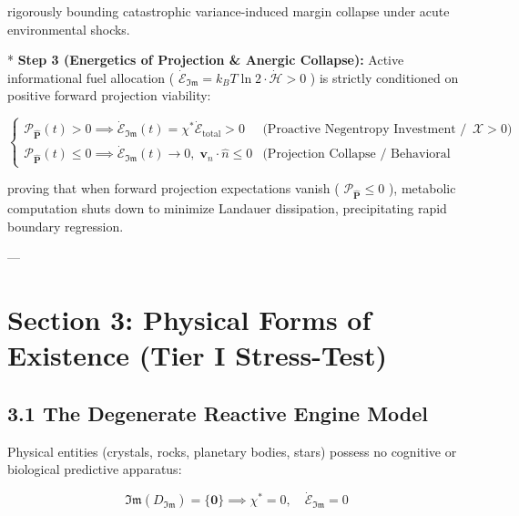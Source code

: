 \documentclass[11pt,a4paper]{article}
\theoremstyle{definition}
\theoremstyle{remark}
\begin{document}
rigorously bounding catastrophic variance-induced margin collapse under acute environmental shocks.

* \textbf{Step 3 (Energetics of Projection \& Anergic Collapse):}
Active informational fuel allocation ( $\dot{\mathcal{E}}_{\mathfrak{Im}} = k_B T \ln 2 \cdot \dot{\mathcal{H}} > 0$ ) is strictly conditioned on positive forward projection viability:


\begin{equation}
\boxed{\begin{cases}
\mathcal{P}_{\hat{\mathbf{P}}}(t) > 0 \implies \dot{\mathcal{E}}_{\mathfrak{Im}}(t) = \chi^* \dot{\mathcal{E}}_{\text{total}} > 0 & \text{(Proactive Negentropy Investment / Exploratory Expression } \boldsymbol{\mathcal{X}} > 0\text{)} \\
\mathcal{P}_{\hat{\mathbf{P}}}(t) \le 0 \implies \dot{\mathcal{E}}_{\mathfrak{Im}}(t) \longrightarrow 0, \; \mathbf{v}_n \cdot \hat{n} \le 0 & \text{(Projection Collapse / Behavioral Withdrawal  and  Anergic Lysis)}
\end{cases}}
\end{equation}


proving that when forward projection expectations vanish ( $\mathcal{P}_{\hat{\mathbf{P}}} \le 0$ ), metabolic computation shuts down to minimize Landauer dissipation, precipitating rapid boundary regression.

---

\section{Section 3: Physical Forms of Existence (Tier I Stress-Test)}

\subsection{3.1 The Degenerate Reactive Engine Model}
Physical entities (crystals, rocks, planetary bodies, stars) possess no cognitive or biological predictive apparatus:


\begin{equation}
\mathfrak{Im}(D_{\mathfrak{Im}}) = \{\mathbf{0}\} \implies \chi^* = 0, \quad \dot{\mathcal{E}}_{\mathfrak{Im}} = 0
\end{equation}
\end{document}

